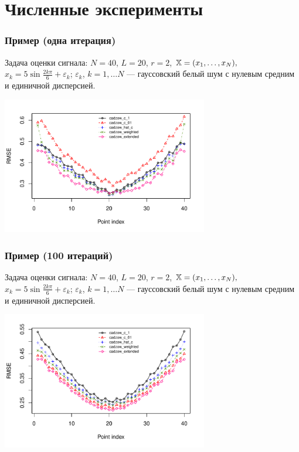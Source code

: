 \documentclass[unicode, notheorems]{beamer}
\begin{document}
 
\section{Численные эксперименты}
\begin{frame}
	\frametitle{Пример (одна итерация)}
	Задача оценки сигнала: $N = 40$, $L = 20$, $r = 2$, $\mathbb{X} = (x_{1}, \ldots, x_N),$  $x_k = 5\sin{\frac{2 k \pi}{6}} + \varepsilon_k$; $\varepsilon_k$, $k = 1, \ldots N$ --- гауссовский белый шум с нулевым средним и единичной дисперсией.
	\vspace{-0.3cm}
	\begin{center}
		\includegraphics*[width = 9cm]{s1_it1.pdf}
	\end{center}
\end{frame}

\begin{frame}
	\frametitle{Пример (100 итераций)}
	Задача оценки сигнала: $N = 40$, $L = 20$, $r = 2$, $\mathbb{X} = (x_{1}, \ldots, x_N),$  $x_k = 5\sin{\frac{2 k \pi}{6}} + \varepsilon_k$; $\varepsilon_k$, $k = 1, \ldots N$ --- гауссовский белый шум с нулевым средним и единичной дисперсией.
	\vspace{-0.3cm}
	
	\begin{center}
		\includegraphics*[width = 9cm]{s1_it100.pdf}
	\end{center}
\end{frame}
\end{document}
